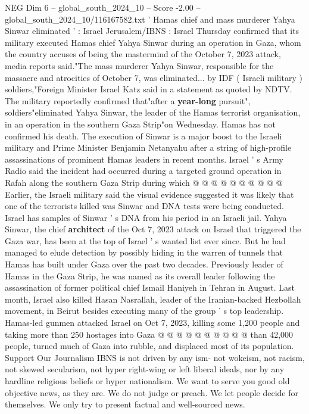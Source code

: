 \begin{textsample}{NEG Dim 6 – global\_south\_2024\_10 – Score -2.00 – global\_south\_2024\_10/116167582.txt}  \label{ex:f6_neg_028}
' Hamas chief and mass murderer Yahya Sinwar eliminated ' : Israel Jerusalem/IBNS : Israel Thursday confirmed that its military executed Hamas chief Yahya Sinwar during an operation in Gaza, whom the country accuses of being the mastermind of the October 7, 2023 attack, media reports said."The mass murderer Yahya Sinwar, responsible for the massacre and atrocities of October 7, was eliminated... by IDF ( Israeli military ) soldiers,"Foreign Minister Israel Katz said in a statement as quoted by NDTV.
The military reportedly confirmed that"after a \textbf{year-long} pursuit", soldiers"eliminated Yahya Sinwar, the leader of the Hamas terrorist organisation, in an operation in the southern Gaza Strip"on Wednesday.
Hamas has not confirmed his death.
The execution of Sinwar is a major boost to the Israeli military and Prime Minister Benjamin Netanyahu after a string of high-profile assassinations of prominent Hamas leaders in recent months.
Israel ' s Army Radio said the incident had occurred during a targeted ground operation in Rafah along the southern Gaza Strip during which @ @ @ @ @ @ @ @ @ @ Earlier, the Israeli military said the visual evidence suggested it was likely that one of the terrorists killed was Sinwar and DNA tests were being conducted.
Israel has samples of Sinwar ' s DNA from his period in an Israeli jail.
Yahya Sinwar, the chief \textbf{architect} of the Oct 7, 2023 attack on Israel that triggered the Gaza war, has been at the top of Israel ' s wanted list ever since.
But he had managed to elude detection by possibly hiding in the warren of tunnels that Hamas has built under Gaza over the past two decades.
Previously leader of Hamas in the Gaza Strip, he was named as its overall leader following the assassination of former political chief Ismail Haniyeh in Tehran in August.
Last month, Israel also killed Hasan Nasrallah, leader of the Iranian-backed Hezbollah movement, in Beirut besides executing many of the group ' s top leadership.
Hamas-led gunmen attacked Israel on Oct 7, 2023, killing some 1,200 people and taking more than 250 hostages into Gaza @ @ @ @ @ @ @ @ @ @ than 42,000 people, turned much of Gaza into rubble, and displaced most of its population.
Support Our Journalism IBNS is not driven by any ism- not wokeism, not racism, not skewed secularism, not hyper right-wing or left liberal ideals, nor by any hardline religious beliefs or hyper nationalism.
We want to serve you good old objective news, as they are.
We do not judge or preach.
We let people decide for themselves.
We only try to present factual and well-sourced news.

\end{textsample}
